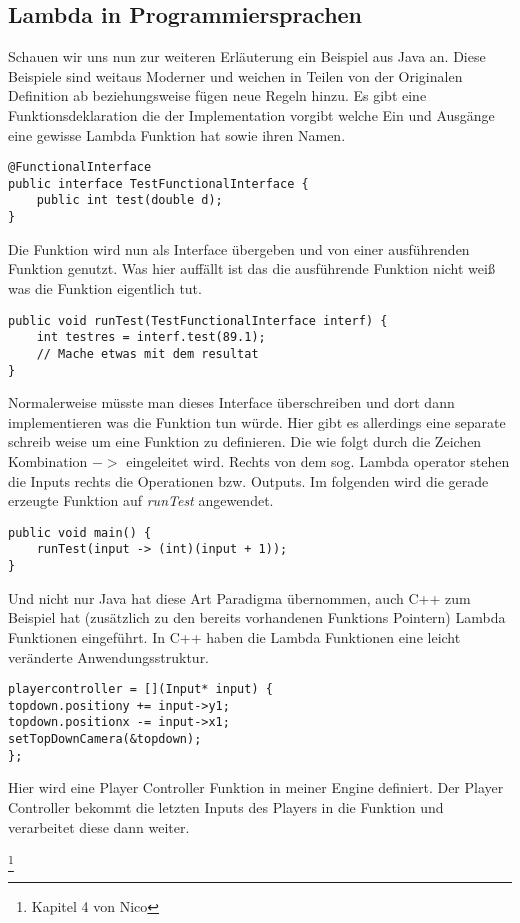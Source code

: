 \subsection{Lambda in Programmiersprachen}
Schauen wir uns nun zur weiteren Erläuterung ein Beispiel aus Java an. Diese Beispiele sind weitaus Moderner und weichen in Teilen von der Originalen Definition ab beziehungsweise fügen neue Regeln hinzu. Es gibt eine Funktionsdeklaration die der Implementation vorgibt welche Ein und Ausgänge eine gewisse Lambda Funktion hat sowie ihren Namen.
\begin{verbatim}
@FunctionalInterface
public interface TestFunctionalInterface {
	public int test(double d);
}
\end{verbatim}
Die Funktion wird nun als Interface übergeben und von einer ausführenden Funktion genutzt.
Was hier auffällt ist das die ausführende Funktion nicht weiß was die Funktion eigentlich tut.
\begin{verbatim}
public void runTest(TestFunctionalInterface interf) {
	int testres = interf.test(89.1);
	// Mache etwas mit dem resultat
}
\end{verbatim}
Normalerweise müsste man dieses Interface überschreiben und dort dann implementieren was die Funktion tun würde. Hier gibt es allerdings eine separate schreib weise um eine Funktion zu definieren. Die wie folgt durch die Zeichen Kombination $->$ eingeleitet wird. Rechts von dem sog. Lambda operator stehen die Inputs rechts die Operationen bzw. Outputs. Im folgenden wird die gerade erzeugte Funktion auf \emph{runTest} angewendet.
\begin{verbatim}
public void main() {
	runTest(input -> (int)(input + 1));
}
\end{verbatim}
Und nicht nur Java hat diese Art Paradigma übernommen, auch C++ zum Beispiel hat (zusätzlich zu den bereits vorhandenen Funktions Pointern) Lambda Funktionen eingeführt.
In C++ haben die Lambda Funktionen eine leicht veränderte Anwendungsstruktur.
\begin{verbatim}
playercontroller = [](Input* input) { 
topdown.positiony += input->y1; 
topdown.positionx -= input->x1;
setTopDownCamera(&topdown); 
};
\end{verbatim}
Hier wird eine Player Controller Funktion in meiner Engine definiert. Der Player Controller bekommt die letzten Inputs des Players in die Funktion und verarbeitet diese dann weiter.

\footnote{Kapitel 4 von Nico}